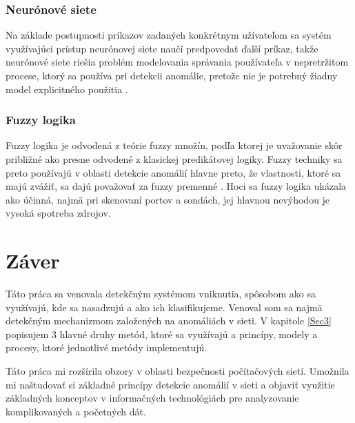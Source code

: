 \subsection*{Neurónové siete}
Na základe postupnosti príkazov zadaných konkrétnym užívateľom sa systém využívajúci prístup neurónovej siete naučí predpovedať ďalší príkaz, takže neurónové siete riešia problém modelovania správania používateľa v nepretržitom procese, ktorý sa používa pri detekcii anomálie, pretože nie je potrebný žiadny model explicitného použitia \cite{AnomalyDetection}.

\subsection*{Fuzzy logika}
Fuzzy logika je odvodená z teórie fuzzy množín, podľa ktorej je uvažovanie skôr približné ako presne odvodené z klasickej predikátovej logiky. Fuzzy techniky sa preto používajú v oblasti detekcie anomálií hlavne preto, že vlastnosti, ktoré sa majú zvážiť, sa dajú považovať za fuzzy premenné \cite{AnomalyMarkovs}. Hoci sa fuzzy logika ukázala ako účinná, najmä pri skenovaní portov a sondách, jej hlavnou nevýhodou je vysoká spotreba zdrojov.


\chapter{Záver}
Táto práca sa venovala detekčným systémom vniknutia, spôsobom ako sa využívajú, kde sa nasadzujú a ako ich klasifikujeme. Venoval som sa najmä detekčným mechanizmom založených na anomáliách v sieti. V kapitole \ref{Sec3} popisujem 3 hlavné druhy metód, ktoré sa využívajú a princípy, modely a procesy, ktoré jednotlivé metódy implementujú. 

Táto práca mi rozšírila obzory v oblasti bezpečnosti počítačových sietí. Umožnila mi naštudovať si základné princípy detekcie anomálií v sieti a objaviť využitie základných konceptov v informačných technológiách pre analyzovanie komplikovaných a početných dát.